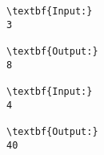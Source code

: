 \begin{verbatim}
\textbf{Input:}
3

\textbf{Output:}
8

\textbf{Input:}
4

\textbf{Output:}
40\end{verbatim}

 